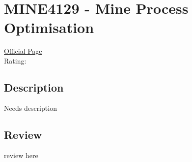 \hypertarget{MINE4129}{\section{MINE4129 - Mine Process Optimisation}}

\large
\textcolor{turbo_purple}{\href{https://my.uq.edu.au/programs-courses/course.html?course_code=MINE4129}{Official Page}} \\
Rating: \cstar\cstar\cstar\cstar\ostar

\normalsize
\subsection*{Description}
Needs description

\subsection*{Review}
review here
